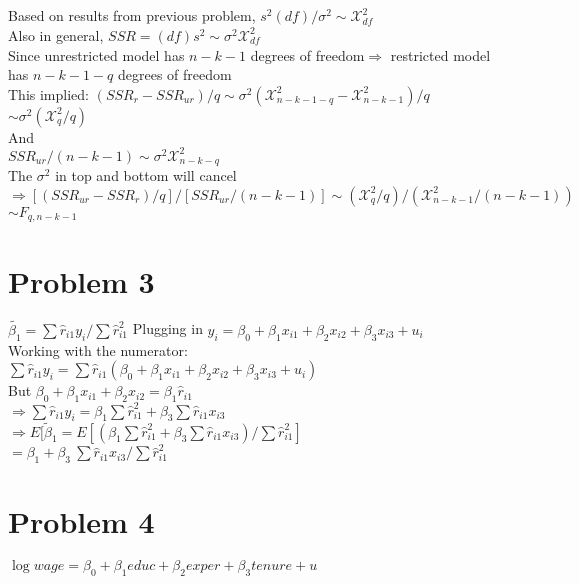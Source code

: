 \documentclass[11pt, oneside]{article}   	%
\begin{document}
\subsection{}
Based on results from previous problem, $s^2(df)/\sigma^2\sim\mathcal{X}_{df}^2$\\
Also in general, $SSR=(df)s^2\sim\sigma^2\mathcal{X}_{df}^2$\\
Since unrestricted model has $n-k-1$ degrees of freedom$\Rightarrow$ restricted model has $n-k-1-q$ degrees of freedom\\
This implied:
\indent $({SSR_r}-SSR_{ur})/q\sim\sigma^2(\mathcal{X}_{n-k-1-q}^2-\mathcal{X}_{n-k-1}^2)/q$\\
\indent\indent$\sim\sigma^2(\mathcal{X}_q^2/q)$\\
\indent And\\
\indent$SSR_{ur}/(n-k-1)\sim\sigma^2\mathcal{X}^2_{n-k-q}$\\
\indent The $\sigma^2$ in top and bottom will cancel\\
\indent$\Rightarrow[(SSR_{ur}-SSR_r)/q]/[SSR_{ur}/(n-k-1)]\sim(\mathcal{X}_q^2/q)/(\mathcal{X}_{n-k-1}^2/(n-k-1))$\\
\indent$\sim F_{q,n-k-1}$\\

\section{Problem 3}
$\tilde{\beta_1}=\sum\hat{r}_{i1}y_i/\sum\hat{r}_{i1}^2$
Plugging in $y_i=\beta_0+\beta_1x_{i1}+\beta_2x_{i2}+\beta_3x_{i3}+u_i$\\
Working with the numerator:\\
$\sum\hat{r}_{i1}y_i=\sum\hat{r}_{i1}(\beta_0+\beta_1x_{i1}+\beta_2x_{i2}+\beta_3x_{i3}+u_i)$\\
But $\beta_0+\beta_1x_{i1}+\beta_2x_{i2}=\beta_1\hat{r}_{i1}$\\
\indent$\Rightarrow \sum\hat{r}_{i1}y_i=\beta_1\sum\hat{r}_{i1}^2 + \beta_3\sum\hat{r}_{i1}x_{i3}$\\
\indent$\Rightarrow E[\tilde{\beta}_1=E[(\beta_1\sum\hat{r}_{i1}^2 + \beta_3\sum\hat{r}_{i1}x_{i3})/\sum\hat{r}_{i1}^2]$\\
\indent\indent$=\beta_1 + \beta_3\ \sum\hat{r}_{i1}x_{i3}/\sum\hat{r}_{i1}^2$\\

\section{Problem 4}
$\log{wage}=\beta_0+\beta_1educ+\beta_2exper+\beta_3tenure+u$\\
\end{document}

